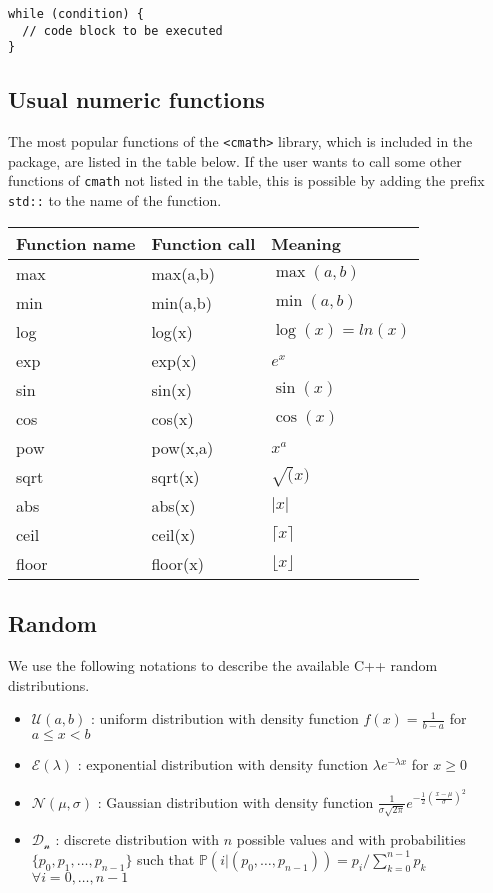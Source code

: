\begin{verbatim}
while (condition) {
  // code block to be executed
}
\end{verbatim}

\hypertarget{usual-numeric-functions}{%
\subsection{Usual numeric functions}\label{usual-numeric-functions}}

The most popular functions of the \texttt{\textless{}cmath\textgreater{}} library, which is included in the package, are listed in the table below. If the user wants to call some other functions of \texttt{cmath} not listed in the table, this is possible by adding the prefix \texttt{std::} to the name of the function.

\begin{longtable}[]{@{}lll@{}}
\toprule
Function name & Function call & Meaning\tabularnewline
\midrule
\endhead
max & max(a,b) & \(\max(a,b)\)\tabularnewline
min & min(a,b) & \(\min(a,b)\)\tabularnewline
log & log(x) & \(\log(x)=ln(x)\)\tabularnewline
exp & exp(x) & \(e^x\)\tabularnewline
sin & sin(x) & \(\sin(x)\)\tabularnewline
cos & cos(x) & \(\cos(x)\)\tabularnewline
pow & pow(x,a) & \(x^a\)\tabularnewline
sqrt & sqrt(x) & \(\sqrt(x)\)\tabularnewline
abs & abs(x) & \(|x|\)\tabularnewline
ceil & ceil(x) & \(\lceil x \rceil\)\tabularnewline
floor & floor(x) & \(\lfloor x \rfloor\)\tabularnewline
\bottomrule
\end{longtable}

\hypertarget{random}{%
\subsection{Random}\label{random}}

We use the following notations to describe the available C++ random distributions.

\begin{itemize}
\tightlist
\item
  \(\mathcal{U}(a,b)\) : uniform distribution with density function \(f(x) = \frac{1}{b-a}\) for \(a\leq x <b\)
\item
  \(\mathcal{E}(\lambda)\) : exponential distribution with density function \(\lambda e^{-\lambda x}\) for \(x\geq 0\)
\item
  \(\mathcal{N}(\mu,\sigma)\) : Gaussian distribution with density function \(\frac{1}{\sigma\sqrt{2\pi}}e^{-\frac 1 2 \left( \frac{x-\mu}{\sigma}\right)^2}\)
\item
  \(\mathcal{D_n}\) : discrete distribution with \(n\) possible values and with probabilities \(\{ p_0, p_1, \ldots, p_{n-1}\}\) such that \(\mathbb{P}(i|(p_0, \ldots, p_{n-1})) = p_i/\sum_{k=0}^{n-1}p_k\) \(\forall i=0, \ldots, n-1\)
\end{itemize}

